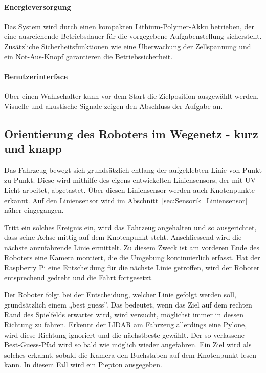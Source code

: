 \documentclass[main.tex]{subfiles} %
\begin{document}
\paragraph{Energieversorgung}

Das System wird durch einen kompakten Lithium-Polymer-Akku betrieben, der eine ausreichende 
Betriebsdauer für die vorgegebene Aufgabenstellung sicherstellt. Zusätzliche Sicherheitsfunktionen 
wie eine Überwachung der Zellspannung und ein Not-Aus-Knopf garantieren die Betriebssicherheit.

\paragraph{Benutzerinterface}

Über einen Wahlschalter kann vor dem Start die Zielposition
ausgewählt werden. Visuelle und akustische Signale zeigen den Abschluss der Aufgabe an.

\newpage

\subsection{Orientierung des Roboters im Wegenetz - kurz und knapp}

Das Fahrzeug bewegt sich grundsätzlich entlang der aufgeklebten Linie von Punkt
zu Punkt. Diese wird mithilfe des eigens entwickelten Liniensensors, der mit
UV-Licht arbeitet, abgetastet. Über diesen Liniensensor werden auch
Knotenpunkte erkannt. Auf den Liniensensor wird im
Abschnitt~\ref{sec:Sensorik_Liniensensor} näher eingegangen.

Tritt ein solches Ereignis ein, wird das Fahrzeug angehalten und so
ausgerichtet, dass seine Achse mittig auf dem Knotenpunkt steht. Anschliessend
wird die nächste anzufahrende Linie ermittelt. Zu diesem Zweck ist am vorderen
Ende des Roboters eine Kamera montiert, die die Umgebung kontinuierlich
erfasst. Hat der Raspberry Pi eine Entscheidung für die nächste Linie
getroffen, wird der Roboter entsprechend gedreht und die Fahrt fortgesetzt.

Der Roboter folgt bei der Entscheidung, welcher Linie gefolgt werden soll,
grundsätzlich einem „best guess”. Das bedeutet, wenn das Ziel auf dem rechten
Rand des Spielfelds erwartet wird, wird versucht, möglichst immer in dessen
Richtung zu fahren. Erkennt der LIDAR am Fahrzeug allerdings eine Pylone, wird
diese Richtung ignoriert und die nächstbeste gewählt. Der so verlassene
Best-Guess-Pfad wird so bald wie möglich wieder angefahren. Ein Ziel wird als
solches erkannt, sobald die Kamera den Buchstaben auf dem Knotenpunkt lesen
kann. In diesem Fall wird ein Piepton ausgegeben.
\end{document}
